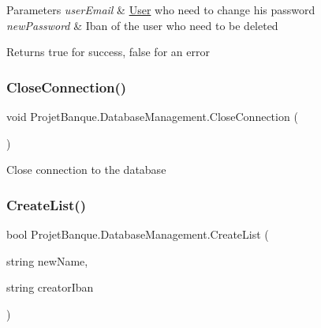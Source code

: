 \begin{DoxyParams}{Parameters}
{\em user\+Email} & \mbox{\hyperlink{class_projet_banque_1_1_user}{User}} who need to change his password\\
\hline
{\em new\+Password} & Iban of the user who need to be deleted\\
\hline
\end{DoxyParams}
\begin{DoxyReturn}{Returns}
true for success, false for an error
\end{DoxyReturn}
\mbox{\label{class_projet_banque_1_1_database_management_aa825c23c3dd06796b8243ce8ed7c6bfb}} 
\subsubsection{\texorpdfstring{CloseConnection()}{CloseConnection()}}
{\footnotesize\ttfamily void Projet\+Banque.\+Database\+Management.\+Close\+Connection (\begin{DoxyParamCaption}{ }\end{DoxyParamCaption})}



Close connection to the database 

\mbox{\label{class_projet_banque_1_1_database_management_acb94b89091289ffd5ca8f24224e46c81}} 
\subsubsection{\texorpdfstring{CreateList()}{CreateList()}}
{\footnotesize\ttfamily bool Projet\+Banque.\+Database\+Management.\+Create\+List (\begin{DoxyParamCaption}\item[{string}]{new\+Name,  }\item[{string}]{creator\+Iban }\end{DoxyParamCaption})}




